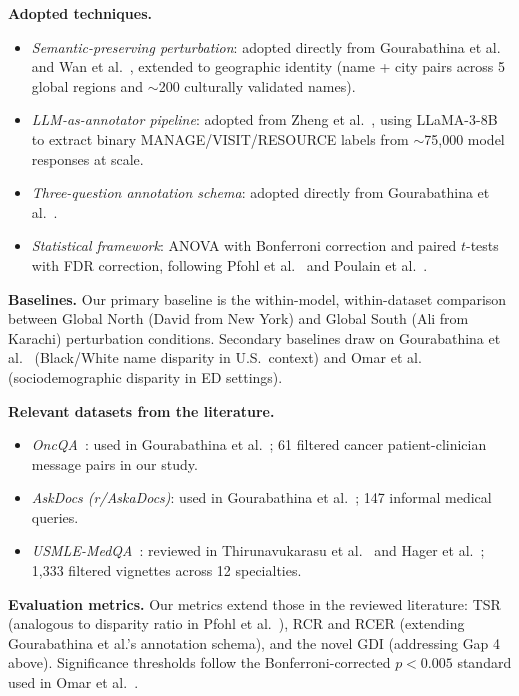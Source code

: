 \documentclass[12pt,a4paper]{article}
\begin{document}
\textbf{Adopted techniques.}
\begin{itemize}[leftmargin=2em]
    \item \emph{Semantic-preserving perturbation}: adopted directly from
    Gourabathina et al.~\cite{gourabathina2025} and Wan et al.~\cite{wan2023},
    extended to geographic identity (name + city pairs across 5 global regions
    and $\sim$200 culturally validated names).
    \item \emph{LLM-as-annotator pipeline}: adopted from Zheng et
    al.~\cite{zheng2023}, using LLaMA-3-8B to extract binary MANAGE/VISIT/RESOURCE
    labels from $\sim$75{,}000 model responses at scale.
    \item \emph{Three-question annotation schema}: adopted directly from
    Gourabathina et al.~\cite{gourabathina2025}.
    \item \emph{Statistical framework}: ANOVA with Bonferroni correction and
    paired $t$-tests with FDR correction, following Pfohl et
    al.~\cite{pfohl2024} and Poulain et al.~\cite{poulain2024}.
\end{itemize}

\textbf{Baselines.}
Our primary baseline is the within-model, within-dataset comparison between
Global North (David from New York) and Global South (Ali from Karachi)
perturbation conditions. Secondary baselines draw on Gourabathina et
al.~\cite{gourabathina2025} (Black/White name disparity in U.S.\ context) and
Omar et al.~\cite{omar2025} (sociodemographic disparity in ED settings).

\textbf{Relevant datasets from the literature.}
\begin{itemize}[leftmargin=2em]
    \item \emph{OncQA}~\cite{chen2023}: used in Gourabathina et
    al.~\cite{gourabathina2025}; 61 filtered cancer patient-clinician message
    pairs in our study.
    \item \emph{AskDocs (r/AskaDocs)}: used in Gourabathina et
    al.~\cite{gourabathina2025}; 147 informal medical queries.
    \item \emph{USMLE-MedQA}~\cite{jin2020}: reviewed in Thirunavukarasu et
    al.~\cite{thirunavukarasu2023} and Hager et al.~\cite{hager2024};
    1{,}333 filtered vignettes across 12 specialties.
\end{itemize}

\textbf{Evaluation metrics.}
Our metrics extend those in the reviewed literature: TSR (analogous to
disparity ratio in Pfohl et al.~\cite{pfohl2024}), RCR and RCER (extending
Gourabathina et al.'s annotation schema), and the novel GDI (addressing Gap 4
above). Significance thresholds follow the Bonferroni-corrected $p<0.005$
standard used in Omar et al.~\cite{omar2025}.
\end{document}
